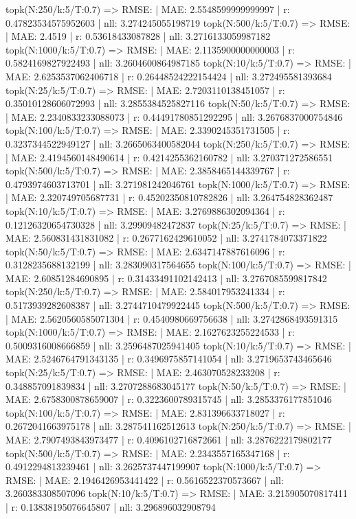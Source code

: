 topk(N:250/k:5/T:0.7) => RMSE: | MAE: 2.5548599999999997 | r: 0.47823534575952603 | nll: 3.274245055198719
topk(N:500/k:5/T:0.7) => RMSE: | MAE: 2.4519 | r: 0.53618433087828 | nll: 3.2716133059987182
topk(N:1000/k:5/T:0.7) => RMSE: | MAE: 2.1135900000000003 | r: 0.5824169827922493 | nll: 3.2604600864987185
topk(N:10/k:5/T:0.7) => RMSE: | MAE: 2.6253537062406718 | r: 0.26448524222154424 | nll: 3.272495581393684
topk(N:25/k:5/T:0.7) => RMSE: | MAE: 2.7203110138451057 | r: 0.35010128606072993 | nll: 3.2855384525827116
topk(N:50/k:5/T:0.7) => RMSE: | MAE: 2.2340833233088073 | r: 0.44491780851292295 | nll: 3.2676837000754846
topk(N:100/k:5/T:0.7) => RMSE: | MAE: 2.3390245351731505 | r: 0.3237344522949127 | nll: 3.2665063400582044
topk(N:250/k:5/T:0.7) => RMSE: | MAE: 2.4194560148490614 | r: 0.4214255362160782 | nll: 3.270371272586551
topk(N:500/k:5/T:0.7) => RMSE: | MAE: 2.3858465144339767 | r: 0.4793974603713701 | nll: 3.271981242046761
topk(N:1000/k:5/T:0.7) => RMSE: | MAE: 2.320749705687731 | r: 0.45202350810782826 | nll: 3.264754828362487
topk(N:10/k:5/T:0.7) => RMSE: | MAE: 3.2769886302094364 | r: 0.12126320654730328 | nll: 3.29909482472837
topk(N:25/k:5/T:0.7) => RMSE: | MAE: 2.560831431831082 | r: 0.2677162429610052 | nll: 3.2741784073371822
topk(N:50/k:5/T:0.7) => RMSE: | MAE: 2.6347147887616096 | r: 0.3128235688132199 | nll: 3.283090317564655
topk(N:100/k:5/T:0.7) => RMSE: | MAE: 2.60851284690895 | r: 0.31433491102142413 | nll: 3.2767085599817842
topk(N:250/k:5/T:0.7) => RMSE: | MAE: 2.584017953241334 | r: 0.5173939282608387 | nll: 3.2744710479922445
topk(N:500/k:5/T:0.7) => RMSE: | MAE: 2.5620560585071304 | r: 0.4540980669756638 | nll: 3.2742868493591315
topk(N:1000/k:5/T:0.7) => RMSE: | MAE: 2.1627623255224533 | r: 0.5009316008666859 | nll: 3.2596487025941405
topk(N:10/k:5/T:0.7) => RMSE: | MAE: 2.5246764791343135 | r: 0.3496975857141054 | nll: 3.2719653743465646
topk(N:25/k:5/T:0.7) => RMSE: | MAE: 2.463070528233208 | r: 0.348857091839834 | nll: 3.2707288683045177
topk(N:50/k:5/T:0.7) => RMSE: | MAE: 2.6758300878659007 | r: 0.3223600789315745 | nll: 3.2853376177851046
topk(N:100/k:5/T:0.7) => RMSE: | MAE: 2.831396633718027 | r: 0.2672041663975178 | nll: 3.287541162512613
topk(N:250/k:5/T:0.7) => RMSE: | MAE: 2.7907493843973477 | r: 0.4096102716872661 | nll: 3.2876222179802177
topk(N:500/k:5/T:0.7) => RMSE: | MAE: 2.2343557165347168 | r: 0.4912294813239461 | nll: 3.2625737447199907
topk(N:1000/k:5/T:0.7) => RMSE: | MAE: 2.1946426953441422 | r: 0.5616522370573667 | nll: 3.260383308507096
topk(N:10/k:5/T:0.7) => RMSE: | MAE: 3.215905070817411 | r: 0.13838195076645807 | nll: 3.296896032908794
